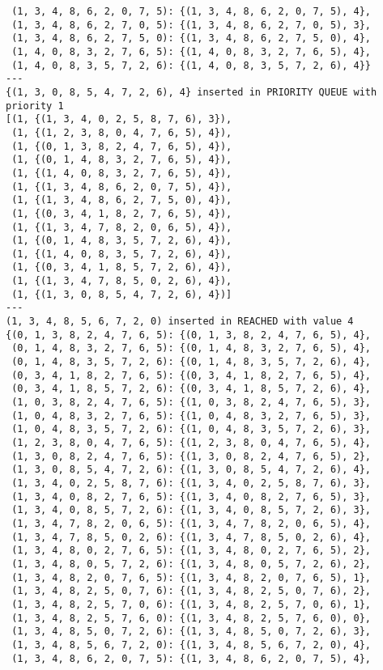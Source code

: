 \documentclass{article}
\begin{document}
\begin{verbatim}
 (1, 3, 4, 8, 6, 2, 0, 7, 5): {(1, 3, 4, 8, 6, 2, 0, 7, 5), 4},
 (1, 3, 4, 8, 6, 2, 7, 0, 5): {(1, 3, 4, 8, 6, 2, 7, 0, 5), 3},
 (1, 3, 4, 8, 6, 2, 7, 5, 0): {(1, 3, 4, 8, 6, 2, 7, 5, 0), 4},
 (1, 4, 0, 8, 3, 2, 7, 6, 5): {(1, 4, 0, 8, 3, 2, 7, 6, 5), 4},
 (1, 4, 0, 8, 3, 5, 7, 2, 6): {(1, 4, 0, 8, 3, 5, 7, 2, 6), 4}}
---
{(1, 3, 0, 8, 5, 4, 7, 2, 6), 4} inserted in PRIORITY QUEUE with priority 1
[(1, {(1, 3, 4, 0, 2, 5, 8, 7, 6), 3}),
 (1, {(1, 2, 3, 8, 0, 4, 7, 6, 5), 4}),
 (1, {(0, 1, 3, 8, 2, 4, 7, 6, 5), 4}),
 (1, {(0, 1, 4, 8, 3, 2, 7, 6, 5), 4}),
 (1, {(1, 4, 0, 8, 3, 2, 7, 6, 5), 4}),
 (1, {(1, 3, 4, 8, 6, 2, 0, 7, 5), 4}),
 (1, {(1, 3, 4, 8, 6, 2, 7, 5, 0), 4}),
 (1, {(0, 3, 4, 1, 8, 2, 7, 6, 5), 4}),
 (1, {(1, 3, 4, 7, 8, 2, 0, 6, 5), 4}),
 (1, {(0, 1, 4, 8, 3, 5, 7, 2, 6), 4}),
 (1, {(1, 4, 0, 8, 3, 5, 7, 2, 6), 4}),
 (1, {(0, 3, 4, 1, 8, 5, 7, 2, 6), 4}),
 (1, {(1, 3, 4, 7, 8, 5, 0, 2, 6), 4}),
 (1, {(1, 3, 0, 8, 5, 4, 7, 2, 6), 4})]
---
(1, 3, 4, 8, 5, 6, 7, 2, 0) inserted in REACHED with value 4
{(0, 1, 3, 8, 2, 4, 7, 6, 5): {(0, 1, 3, 8, 2, 4, 7, 6, 5), 4},
 (0, 1, 4, 8, 3, 2, 7, 6, 5): {(0, 1, 4, 8, 3, 2, 7, 6, 5), 4},
 (0, 1, 4, 8, 3, 5, 7, 2, 6): {(0, 1, 4, 8, 3, 5, 7, 2, 6), 4},
 (0, 3, 4, 1, 8, 2, 7, 6, 5): {(0, 3, 4, 1, 8, 2, 7, 6, 5), 4},
 (0, 3, 4, 1, 8, 5, 7, 2, 6): {(0, 3, 4, 1, 8, 5, 7, 2, 6), 4},
 (1, 0, 3, 8, 2, 4, 7, 6, 5): {(1, 0, 3, 8, 2, 4, 7, 6, 5), 3},
 (1, 0, 4, 8, 3, 2, 7, 6, 5): {(1, 0, 4, 8, 3, 2, 7, 6, 5), 3},
 (1, 0, 4, 8, 3, 5, 7, 2, 6): {(1, 0, 4, 8, 3, 5, 7, 2, 6), 3},
 (1, 2, 3, 8, 0, 4, 7, 6, 5): {(1, 2, 3, 8, 0, 4, 7, 6, 5), 4},
 (1, 3, 0, 8, 2, 4, 7, 6, 5): {(1, 3, 0, 8, 2, 4, 7, 6, 5), 2},
 (1, 3, 0, 8, 5, 4, 7, 2, 6): {(1, 3, 0, 8, 5, 4, 7, 2, 6), 4},
 (1, 3, 4, 0, 2, 5, 8, 7, 6): {(1, 3, 4, 0, 2, 5, 8, 7, 6), 3},
 (1, 3, 4, 0, 8, 2, 7, 6, 5): {(1, 3, 4, 0, 8, 2, 7, 6, 5), 3},
 (1, 3, 4, 0, 8, 5, 7, 2, 6): {(1, 3, 4, 0, 8, 5, 7, 2, 6), 3},
 (1, 3, 4, 7, 8, 2, 0, 6, 5): {(1, 3, 4, 7, 8, 2, 0, 6, 5), 4},
 (1, 3, 4, 7, 8, 5, 0, 2, 6): {(1, 3, 4, 7, 8, 5, 0, 2, 6), 4},
 (1, 3, 4, 8, 0, 2, 7, 6, 5): {(1, 3, 4, 8, 0, 2, 7, 6, 5), 2},
 (1, 3, 4, 8, 0, 5, 7, 2, 6): {(1, 3, 4, 8, 0, 5, 7, 2, 6), 2},
 (1, 3, 4, 8, 2, 0, 7, 6, 5): {(1, 3, 4, 8, 2, 0, 7, 6, 5), 1},
 (1, 3, 4, 8, 2, 5, 0, 7, 6): {(1, 3, 4, 8, 2, 5, 0, 7, 6), 2},
 (1, 3, 4, 8, 2, 5, 7, 0, 6): {(1, 3, 4, 8, 2, 5, 7, 0, 6), 1},
 (1, 3, 4, 8, 2, 5, 7, 6, 0): {(1, 3, 4, 8, 2, 5, 7, 6, 0), 0},
 (1, 3, 4, 8, 5, 0, 7, 2, 6): {(1, 3, 4, 8, 5, 0, 7, 2, 6), 3},
 (1, 3, 4, 8, 5, 6, 7, 2, 0): {(1, 3, 4, 8, 5, 6, 7, 2, 0), 4},
 (1, 3, 4, 8, 6, 2, 0, 7, 5): {(1, 3, 4, 8, 6, 2, 0, 7, 5), 4},

\end{verbatim}
\end{document}
